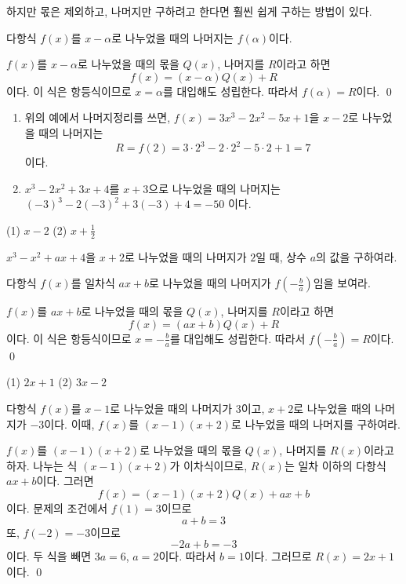 \documentclass{oblivoir}
\begin{document}
하지만 몫은 제외하고, 나머지만 구하려고 한다면 훨씬 쉽게 구하는 방법이 있다.

\begin{mdframed}
%
다항식 \(f(x)\)를 \(x-\alpha\)로 나누었을 때의 나머지는 \(f(\alpha)\)이다.
\end{mdframed}

%
\proo
\(f(x)\)를 \(x-\alpha\)로 나누었을 때의 몫을 \(Q(x)\), 나머지를 \(R\)이라고 하면
\[f(x)=(x-\alpha)Q(x)+R\]
이다.
이 식은 항등식이므로 \(x=\alpha\)를 대입해도 성립한다.
따라서 \(f(\alpha)=R\)이다.
\qed

%
\exam{}
\begin{enumerate}
\item
위의 예에서 나머지정리를 쓰면, \(f(x)=3x^3-2x^2-5x+1\)을 \(x-2\)로 나누었을 때의 나머지는
\[R=f(2)=3\cdot2^3-2\cdot2^2-5\cdot2+1=7\]
이다.
\item
\(x^3-2x^2+3x+4\)를 \(x+3\)으로 나누었을 때의 나머지는
\((-3)^3-2(-3)^2+3(-3)+4=-50\)
이다.
\end{enumerate}

\clearpage
%
\label{iden7}
\par\noindent
(1) \(x-2\)
(2) \(x+\frac12\)

%
\prob{}
\label{iden8}
\(x^3-x^2+ax+4\)을 \(x+2\)로 나누었을 때의 나머지가 \(2\)일 때, 상수 \(a\)의 값을 구하여라.

%
\exam{}
다항식 \(f(x)\)를 일차식 \(ax+b\)로 나누었을 때의 나머지가 \(f\left(-\frac ba\right)\)임을 보여라.
\begin{mdframed}
\(f(x)\)를 \(ax+b\)로 나누었을 때의 몫을 \(Q(x)\), 나머지를 \(R\)이라고 하면
\[f(x)=(ax+b)Q(x)+R\]
이다.
이 식은 항등식이므로 \(x=-\frac ba\)를 대입해도 성립한다.
따라서 \(f\left(-\frac ba\right)=R\)이다.
\qed
\end{mdframed}

%
\label{iden9}
\par\noindent
(1) \(2x+1\)
(2) \(3x-2\)

\clearpage
%
\exam{}
다항식 \(f(x)\)를 \(x-1\)로 나누었을 때의 나머지가 \(3\)이고, \(x+2\)로 나누었을 때의 나머지가 \(-3\)이다.
이때, \(f(x)\)를 \((x-1)(x+2)\)로 나누었을 때의 나머지를 구하여라.
\begin{mdframed}
\(f(x)\)를 \((x-1)(x+2)\)로 나누었을 때의 몫을 \(Q(x)\), 나머지를 \(R(x)\)이라고 하자.
나누는 식 \((x-1)(x+2)\)가 이차식이므로, \(R(x)\)는 일차 이하의 다항식 \(ax+b\)이다.
그러면
\[f(x)=(x-1)(x+2)Q(x)+ax+b\]
이다.
문제의 조건에서 \(f(1)=3\)이므로
\[a+b=3\]
또, \(f(-2)=-3\)이므로
\[-2a+b=-3\]
이다.
두 식을 빼면 \(3a=6\), \(a=2\)이다.
따라서 \(b=1\)이다.
그러므로 \(R(x)=2x+1\)이다.
\qed
\end{mdframed}
\end{document}
